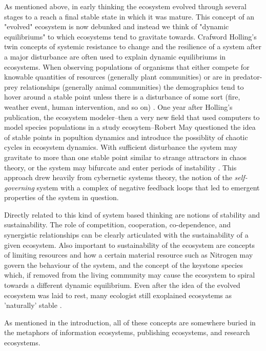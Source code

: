 As mentioned above, in early thinking the ecosystem evolved through several stages to a reach a final stable state in which it was mature. This concept of an "evolved" ecosystem is now debunked and instead we think of "dynamic equilibriums" to which ecosystems tend to gravitate towards. Crafword Holling's twin concepts of systemic resistance to change and the resilience of a system after a major disturbance are often used to explain dynamic equilibriums in ecosystems. When observing populations of organisms that either compete for knowable quantities of resources (generally plant communities) or are in predator-prey relationships (generally animal communities) the demographics tend to hover around a stable point unless there is a disturbance of some sort (fire, weather event, human intervention, and so on) \cite{holling_1973}. One year after Holling's publication, the ecosystem modeler--then a very new field that used computers to model species populations in a study ecosytem--Robert May questioned the idea of stable points in popultion dynamics and introduce the possiblity of chaotic cycles in ecosystem dynamics. With sufficient disturbance the system may gravitate to more than one stable point similar to strange attractors in chaos theory, or the system may bifurcate and enter periods of instability \cite{may_1974}. This approach drew heavily from cybernetic systems theory, the notion of the \textit{self-governing} system with a complex of negative feedback loops that led to emergent properties of the system in question. 



Directly related to this kind of system based thinking are notions of stability and sustainability. The role of competition, cooperation, co-dependence, and synergistic relationships can be clearly articulated with the sustainability of a given ecosystem. Also important to sustainability of the ecosystem are concepts of limiting resources and how a certain material resource such as Nitrogen may govern the behaviour of the system, and the concept of the keystone species which, if removed from the living community may cause the ecosystem to spiral towards a different dynamic equilibrium. Even after the idea of the evolved ecosystem was laid to rest, many ecologist still exoplained ecosystems as 'naturally' stable \cite{odum_1953}.  

As mentioned in the introduction, all of these concepts are somewhere buried in the metaphors of information ecosystems, publishing ecosystems, and research ecosystems.

